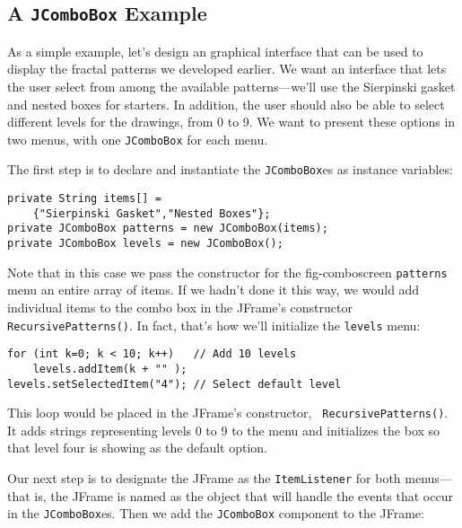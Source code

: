 \subsection{A {\tt JComboBox} Example}

\noindent As a simple example, let's design an graphical interface that
can be used to display the fractal patterns we developed earlier.  We
want an interface that lets the user select from among the available
patterns---we'll use the Sierpinski gasket and nested boxes for
starters.  In addition, the user should also be able to select
different levels for the drawings, from 0 to 9. We want to present
these options in two menus, with one {\tt JComboBox} for each menu.

The first step is to declare and instantiate the {\tt JComboBox}es
as instance variables:

\begin{jjjlisting}
\begin{lstlisting}
private String items[] = 
    {"Sierpinski Gasket","Nested Boxes"};
private JComboBox patterns = new JComboBox(items);
private JComboBox levels = new JComboBox();
\end{lstlisting}
\end{jjjlisting}

\noindent Note that in this case we pass the constructor for the
{fig-comboscreen}
{\tt patterns} menu an entire array of items.  If we hadn't done it
this way, we would add individual items to the combo box in the
JFrame's constructor {\tt RecursivePatterns()}.  In fact, that's how we'll initialize
the {\tt levels} menu:

\begin{jjjlisting}
\begin{lstlisting}
for (int k=0; k < 10; k++)   // Add 10 levels
    levels.addItem(k + "" );
levels.setSelectedItem("4"); // Select default level
\end{lstlisting}
\end{jjjlisting}

\noindent This loop would be placed in the JFrame's constructor, {\tt
  RecursivePatterns()}.  
It adds strings representing levels 0 to 9 to the menu
and initializes the box so that level four is  showing as the
default option.

Our next step is to designate the JFrame as the {\tt ItemListener} for
both menus---that is, the JFrame is named as the object that will
handle the events that occur in the {\tt JComboBox}es.  Then we add the
{\tt JComboBox} component to the JFrame:

